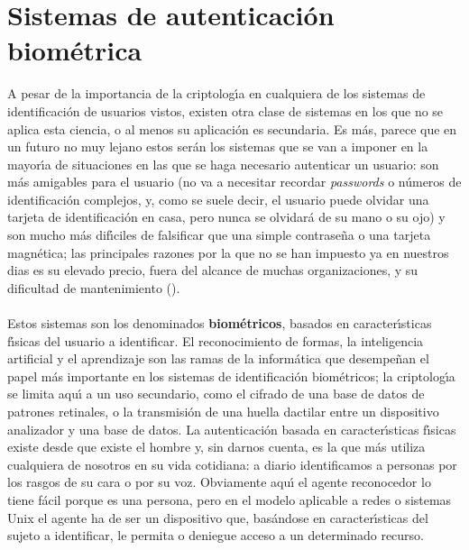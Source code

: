 \section{Sistemas de autenticaci\'on biom\'etrica}
A pesar de la importancia de la criptolog\'{\i}a en cualquiera de los sistemas 
de 
identificaci\'on de usuarios vistos, existen otra clase de sistemas en los que 
no se aplica esta ciencia, o al menos su aplicaci\'on es secundaria. Es m\'as,
parece que en un futuro no muy lejano estos ser\'an los sistemas que se van a 
imponer en la mayor\'{\i}a de situaciones en las que se haga necesario 
autenticar un usuario: son m\'as amigables para el usuario (no va a necesitar 
recordar {\it passwords} o n\'umeros de identificaci\'on complejos, y, como se 
suele decir, el usuario puede olvidar una tarjeta de identificaci\'on en casa, 
pero nunca se olvidar\'a de su mano o su ojo) y son mucho m\'as 
dif\'{\i}ciles de falsificar que una simple contrase\~na o una tarjeta 
magn\'etica; las principales razones por la que no se han impuesto ya
en nuestros dias es su elevado precio, fuera del alcance de muchas 
organizaciones, y su dificultad de mantenimiento (\cite{kn:gue97}).\\
\\Estos sistemas son los denominados {\bf biom\'etricos}, basados en 
caracter\'{\i}sticas f\'{\i}sicas del usuario a identificar. El reconocimiento 
de formas, la inteligencia artificial y el aprendizaje son las ramas de la 
inform\'atica que desempe\~nan el papel m\'as importante en los sistemas de 
identificaci\'on biom\'etricos; la criptolog\'{\i}a se limita aqu\'{\i} a un uso
secundario, como el cifrado de una base de datos de patrones retinales, o la 
transmisi\'on de una huella dactilar entre un dispositivo analizador y una base
de datos.
La autenticaci\'on basada en caracter\'{\i}sticas f\'{\i}sicas existe desde 
que existe el hombre y, sin darnos cuenta, es la que m\'as utiliza cualquiera
de nosotros en su vida cotidiana: a diario identificamos a personas por los
rasgos de su cara o por su voz. Obviamente aqu\'{\i} el agente reconocedor lo
tiene f\'acil porque es una persona, pero en el modelo aplicable a redes o 
sistemas Unix el agente ha de ser un 
dispositivo que, bas\'andose en caracter\'{\i}sticas del sujeto a identificar,
le permita o deniegue acceso a un determinado recurso.\\
